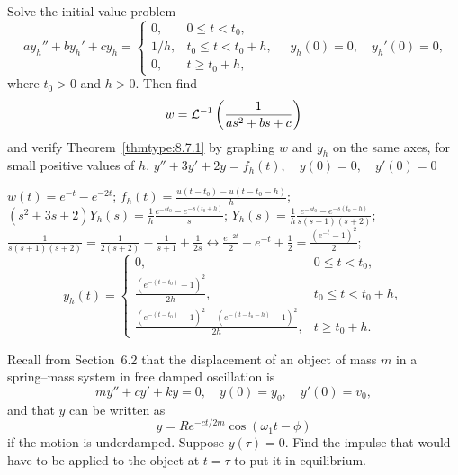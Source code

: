 \documentclass{ximera}
\begin{document}
\begin{problem}\label{exer:8.7.28} Solve the initial value problem
$$
ay_h''+by_h'+cy_h=
\left\{\begin{array}{cl} 0,&0\le t<t_0,\\
1/h,&t_0\le t< t_0+h,\\
0,&t\ge t_0+h,\end{array}\right.
\quad y_h(0)=0,\quad y_h'(0)=0,
$$
where $t_0>0$ and $h>0$. Then find
$$
w={\cal L}^{-1}\left(\frac{1}{as^2+bs+c}\right)
$$
and verify Theorem~\ref{thmtype:8.7.1} by graphing $w$ and $y_h$
on the same axes, for small positive values of $h$.
$y''+3y'+2y=f_h(t), \quad  y(0)=0,\quad y'(0)=0$

\begin{solution}
$w(t)=e^{-t}-e^{-2t}$;
$f_h(t)=\frac{u(t-t_0)-u(t-t_0-h)}{h}$;
$(s^2+3s+2)Y_h(s)=\frac{1}{h}\frac{e^{-st_0}-e^{-s(t_0+h)}}{s}$;
$Y_h(s)=\frac{1}{h}\frac{e^{-st_0}-e^{-s(t_0+h)}}{s(s+1)(s+2)}$;
$\frac{1}{s(s+1)(s+2)}=\frac{1}{2(s+2)}-\frac{1}{s+1}+\frac{1}{2s}\leftrightarrow
\frac{e^{-2t}}{2}-e^{-t}+\frac{1}{2}=\frac{(e^{-t}-1)^2}{2}$;
$$
y_h(t)=
\left\{\begin{array}{cl} 0,&0\le t<t_0,\\ 
\frac{(e^{-(t-t_0)}-1)^2}{2h}, &t_0\le t< t_0+h,\\ 
\frac{(e^{-(t-t_0)}-1)^2-(e^{-(t-t_0-h)}-1)^2}{2h}, &t\ge t_0+h.\end{array}\right. $$
\end{solution}
\end{problem}

\begin{problem}\label{exer:8.7.29}

Recall from Section~6.2 that the displacement of
an
object of mass $m$ in a spring--mass system in free damped oscillation is
$$
my''+cy'+ky=0, \quad  y(0)=y_0,\quad y'(0)=v_0,
$$
and that $y$ can be written as
$$
y=Re^{-ct/2m}\cos(\omega_1t-\phi)
$$
if the motion is underdamped. Suppose $y(\tau)=0$.
Find the impulse that would have to be applied to the object at $t=\tau$
 to put it in equilibrium.
\end{problem}
\end{document}
